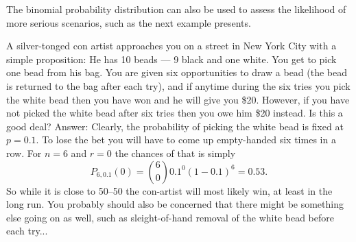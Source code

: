 The binomial probability distribution can also be used to assess the likelihood of more serious scenarios, such as the
next example presents.
\begin{example}
	A silver-tonged con artist approaches you on a street in New York City with a simple proposition: He has
	10 beads --- 9 black and one white.  You get to pick one bead from his bag.  You are
	given six opportunities to draw a bead (the bead is returned to the bag after each try), and
	if anytime during the six tries you pick the white bead then you have won and he will give you \$20.
	However, if you
	have not picked the white bead after six tries then you owe him \$20 instead.  Is this a good deal?
	Answer: Clearly, the probability of picking the white bead is fixed at $p = 0.1$. To lose
	the bet you will have to come up empty-handed six times in a row.  For $n = 6$ and $r = 0$ the
	chances of that is simply
\begin{equation}
P_{6,0.1}(0) =  \binom{6}{0} 0.1^0(1-0.1)^6 = 0.53.
\end{equation}
So while it is close to 50--50 the con-artist will most likely win, at least in the long run.
You probably should also be concerned that there might be something else going on as well, such as sleight-of-hand
removal of the white bead before each try...
\end{example}

